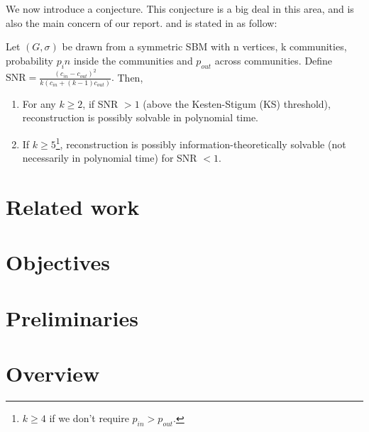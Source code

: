 We now introduce a conjecture. This conjecture is a big deal in this area, and is also the main concern of our report. and is stated in \cite{TheConjecture} as follow:
\begin{conjecture}\label{Conj}
    Let $(G, \sigma)$ be drawn from a symmetric SBM with n vertices, k communities, probability $p_in$ inside the communities and $p_{out}$ across communities. Define $\text{SNR} = \frac{(c_{in}-c_{out})^2}{k(c_{in}+(k-1)c_{out})}.$ Then,
\begin{enumerate}
    \item For any \(k \geq 2\), if SNR \(> 1\) (above the Kesten-Stigum (KS) threshold), reconstruction is possibly solvable in polynomial time.
    \item If \(k \geq 5\)\footnote{$k\geq4$ if we don't require $p_{in}>p_{out}.$},  reconstruction is possibly information-theoretically solvable (not necessarily in polynomial time) for SNR $<1$.
\end{enumerate}
\end{conjecture}
\newpage
\section{Related work}
\section{Objectives}
\section{Preliminaries}
\section{Overview}

